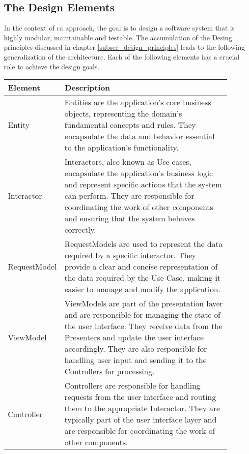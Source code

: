 \subsection{The Design Elements} \label{subsec_design_elements}

In the context of \gls{ca} approach, the goal is to design a software system that is highly
modular, maintainable and testable. The accumulation of the Desing principles discussed
in chapter \ref{subsec_design_principles} leads to the following generalization of the
architecture. Each of the following elements has a crucial role to achieve the
design goals.

\begin{table}[H]
    \begin{tabular}{ p{0.15\linewidth} p{0.75\linewidth}}
        \hline
        \textbf{Element} & \textbf{Description} \\ 
        \hline
        Entity & Entities are the application's core business objects, representing the
        domain's fundamental concepts and rules. They encapsulate the data and behavior
        essential to the application's functionality.\\ \midrule

        Interactor & Interactors, also known as Use cases, encapsulate the application's
        business logic and represent specific actions that the system can perform. They
        are responsible for coordinating the work of other components and ensuring that
        the system behaves correctly.\\ \midrule

        RequestModel & RequestModels are used to represent the data required by a specific
        interactor. They provide a clear and concise representation of the data required
        by the Use Case, making it easier to manage and modify the application.\\ \midrule

        ViewModel & ViewModels are part of the presentation layer and are responsible for
        managing the state of the user interface. They receive data from the Presenters
        and update the user interface accordingly. They are also responsible for handling
        user input and sending it to the Controllers for processing.\\ \midrule

        Controller & Controllers are responsible for handling requests from the user
        interface and routing them to the appropriate Interactor. They are typically part
        of the user interface layer and are responsible for coordinating the work of other
        components.\\ \midrule


\end{tabular}
\end{table}
